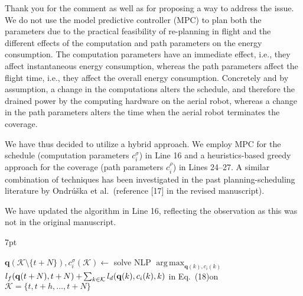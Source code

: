 \documentclass[10pt]{letter}
\DeclareMathOperator*{\argmax}{arg\,max}
\newenvironment{formal}{%
  \def\FrameCommand{%
    \hspace{1pt}%
    {\color{red}\vrule width 2pt}%
    {\color{formalshade}\vrule width 4pt}%
    \colorbox{formalshade}%
  }%
  \MakeFramed{\advance\hsize-\width\FrameRestore}%
  \noindent\hspace{-4.55pt}%
  \begin{adjustwidth}{}{7pt}%
  \vspace{2pt}\vspace{2pt}%
}
{%
  \vspace{2pt}\end{adjustwidth}\endMakeFramed%
}
\begin{document}
{\color{blue} 

{\hspace*{-4.5em}{[R1:2]}\vspace*{-1.9em}}

Thank you for the comment as well as for proposing a way to address the issue. We do not use the model predictive controller (MPC) to plan both the parameters due to the practical feasibility of re-planning in flight and the different effects of the computation and path parameters on the energy consumption. The computation parameters have an immediate effect, i.e., they affect instantaneous energy consumption, whereas the path parameters affect the flight time, i.e., they affect the overall energy consumption. 
Concretely and by assumption, a change in the computations alters the schedule, and therefore the drained power by the computing hardware on the aerial robot, whereas a change in the path parameters alters the time when the aerial robot terminates the coverage.

We have thus decided to utilize a hybrid approach. We employ MPC for the schedule (computation parameters $c_i^\sigma$) in Line 16 and a heuristics-based greedy approach for the coverage (path parameters $c_i^\rho$) in Lines 24–27.
A similar combination of techniques has been investigated in the past planning-scheduling literature by Ondr\'{u}\v{s}ka et al.~(reference [{\color{green}17}] in the revised manuscript).

We have updated the algorithm in Line 16, reflecting the observation as this was not in the original manuscript.

\begin{formal}
\begin{algorithmic}[1]
  \small
    \makeatletter
    \setcounter{ALC@line}{15}
    \makeatother
    \color{blue}\STATE $\mathbf{q}(\mathcal{K}\setminus\{t+N\}),c_i^\sigma(\mathcal{K})\gets${ \vspace*{.3ex}solve NLP }$\argmax_{\mathbf{q}(k),c_i(k)}$\newline \vspace*{.7ex}\hspace*{1em}${l_f(\mathbf{q}(t+\hspace*{-.1ex}N),t+\hspace*{-.1ex}N)}+\hspace*{-.2ex}{\sum_{k\in\mathcal{K}}{l_d(\mathbf{q}(k),c_i(k),k)}}${ in Eq.~({\color{red}18})\newline \hspace*{1em}on }$\mathcal{K}=\{t,t+h,\dots,t+N\}$\vspace*{.3ex}
      

\end{algorithmic}
\end{formal}}
\end{document}
